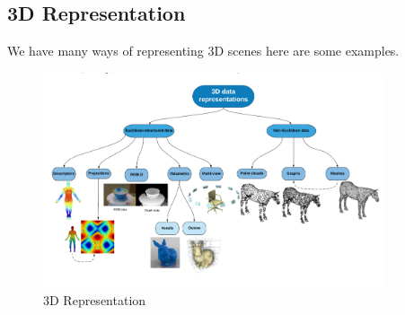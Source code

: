 \documentclass[a4paper]{article}
\begin{document}
\subsection{3D Representation}
We have many ways of representing 3D scenes here are some examples. 
\begin{figure}[h]
    \centering
    \includegraphics[width=0.9\textwidth]{images/representation.png}
    \caption{3D Representation}
    \label{fig:3D Representation}
\end{figure}
\end{document}
